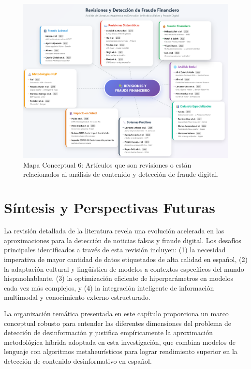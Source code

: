 \begin{figure}[h!]
    \centering
    \includegraphics[width=\textwidth]{Imagenes/mapaConceptual6.png}
    \caption{Mapa Conceptual 6: Artículos que son revisiones o están relacionados al análisis de contenido y detección de fraude digital.}
    \label{fig:mapa_conceptual_6}
\end{figure}

\section{Síntesis y Perspectivas Futuras}
\label{sec:sintesis_perspectivas}

La revisión detallada de la literatura revela una evolución acelerada en las aproximaciones para la detección de noticias falsas y fraude digital. Los desafíos principales identificados a través de esta revisión incluyen: (1) la necesidad imperativa de mayor cantidad de datos etiquetados de alta calidad en español, (2) la adaptación cultural y lingüística de modelos a contextos específicos del mundo hispanohablante, (3) la optimización eficiente de hiperparámetros en modelos cada vez más complejos, y (4) la integración inteligente de información multimodal y conocimiento externo estructurado.

La organización temática presentada en este capítulo proporciona un marco conceptual robusto para entender las diferentes dimensiones del problema de detección de desinformación y justifica empíricamente la aproximación metodológica híbrida adoptada en esta investigación, que combina modelos de lenguaje con algoritmos metaheurísticos para lograr rendimiento superior en la detección de contenido desinformativo en español.